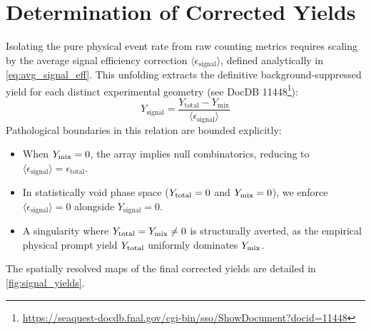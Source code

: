 \documentclass[11pt]{article}
\begin{document}
\FloatBarrier
\section{Determination of Corrected Yields}
\label{sec:corrected_yields}

Isolating the pure physical event rate from raw counting metrics requires scaling by the average signal efficiency correction $\langle\epsilon_{\text{signal}}\rangle$, defined analytically in \cref{eq:avg_signal_eff}. This unfolding extracts the definitive background-suppressed yield for each distinct experimental geometry (see DocDB 11448\footnote{\url{https://seaquest-docdb.fnal.gov/cgi-bin/sso/ShowDocument?docid=11448}}):
\begin{equation}
\label{eq:y_signal}
    Y_{\text{signal}} = \frac{Y_{\text{total}}-Y_{\text{mix}}}{\langle\epsilon_{\text{signal}}\rangle}
\end{equation}
Pathological boundaries in this relation are bounded explicitly:
\begin{itemize}
\item When $Y_{\rm mix}=0$, the array implies null combinatorics, reducing to $\langle\epsilon_{\text{signal}}\rangle = \epsilon_{\text{total}}$.
\item In statistically void phase space ($Y_{\rm total}=0$ and $Y_{\rm mix}=0$), we enforce $\langle\epsilon_{\text{signal}}\rangle = 0$ alongside $Y_{\text{signal}} = 0$. 
\item A singularity where $Y_{\rm total}=Y_{\rm mix}\neq 0$ is structurally averted, as the empirical physical prompt yield $Y_{\rm total}$ uniformly dominates $Y_{\rm mix}$.
\end{itemize}
The spatially resolved maps of the final corrected yields are detailed in \cref{fig:signal_yields}.
\end{document}
